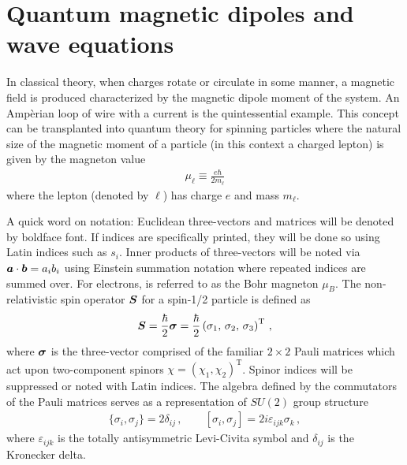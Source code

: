 

\section{Quantum magnetic dipoles and wave equations}
\label{sec:mom}
In classical theory, when charges rotate or circulate in some manner, a magnetic field is produced characterized by the magnetic dipole moment of the system. An Amp{\`e}rian loop of wire with a current is the quintessential example. This concept can be transplanted into quantum theory for spinning particles where the natural size of the magnetic moment of a particle (in this context a charged lepton) is given by the magneton value
\begin{gather}
    \label{mag:1}
    \mu_{\ell}\equiv\frac{e\hbar}{2m_{\ell}}
\end{gather}
where the lepton (denoted by $\ell$) has charge $e$ and mass $m_{\ell}$. 

A quick word on notation: Euclidean three-vectors and matrices will be denoted by boldface font. If indices are specifically printed, they will be done so using Latin indices such as $s_{i}$. Inner products of three-vectors will be noted via $\boldsymbol{a}\cdot\boldsymbol{b}=a_{i}b_{i}$ using Einstein summation notation where repeated indices are summed over. For electrons,  is referred to as the Bohr magneton $\mu_{B}$. The non-relativistic spin operator $\boldsymbol{S}$ for a spin-1/2 particle is defined as
\begin{gather}
    \label{qspin:1}
    \boldsymbol{S}=\frac{\hbar}{2}\boldsymbol{\sigma}=\frac{\hbar}{2}\left(\sigma_{1},\,\sigma_{2},\,\sigma_{3}\right)^\mathrm{T}\,,
\end{gather}
where $\boldsymbol{\sigma}$ is the three-vector comprised of the familiar $2\times2$ Pauli matrices which act upon two-component spinors $\chi=(\chi_{1},\chi_{2})^\mathrm{T}$. Spinor indices will be suppressed or noted with Latin indices. The algebra defined by the commutators of the Pauli matrices serves as a representation of $SU(2)$ group structure
\begin{gather}
    \label{pauli:1}
    \{\sigma_{i},\sigma_{j}\}=2\delta_{ij}\,,\qquad
    [\sigma_{i},\sigma_{j}] = 2i\varepsilon_{ijk}\sigma_{k}\,,
\end{gather}
where $\varepsilon_{ijk}$ is the totally antisymmetric Levi-Civita symbol and $\delta_{ij}$ is the Kronecker delta.

